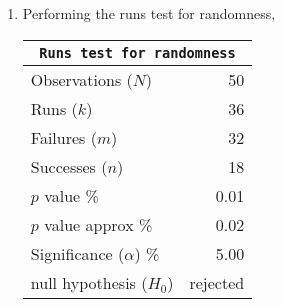 \begin{enumerate}
	
	\item Performing the runs test for randomness,
	
	\begin{table}[H]
		\centering
		\begin{tabular}{@{}lr@{}}
			\toprule
			\multicolumn{2}{c}{\texttt{Runs test for randomness}} \\
			\midrule
			Observations ($N$)         &        50 \\
			Runs ($k$)                 &        36 \\
			Failures ($m$)             &        32 \\
			Successes ($n$)            &        18 \\
			$p$ value \%               &      0.01 \\
			$p$ value approx \%        &      0.02 \\
			Significance ($\alpha$) \% &      5.00 \\
			null hypothesis ($H_0$)    &  rejected \\
			\bottomrule
		\end{tabular}
		
	\end{table}
	\bigskip
\end{enumerate}

